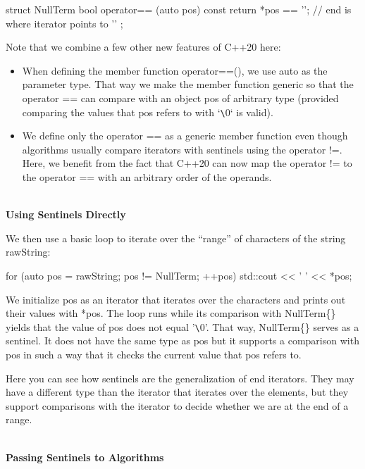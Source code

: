\begin{cpp}
struct NullTerm {
	bool operator== (auto pos) const {
		return *pos == '\0'; // end is where iterator points to ’\0’
	}
};
\end{cpp}

Note that we combine a few other new features of C++20 here:

\begin{itemize}
\item
When defining the member function operator==(), we use auto as the parameter type. That way we make the member function generic so that the operator == can compare with an object pos of arbitrary type (provided comparing the values that pos refers to with ‘\verb|\|0‘ is valid).

\item
We define only the operator == as a generic member function even though algorithms usually compare iterators with sentinels using the operator !=. Here, we benefit from the fact that C++20 can now map the operator != to the operator == with an arbitrary order of the operands.
\end{itemize}

\noindent
\hspace*{\fill} \\ %
\textbf{Using Sentinels Directly}

We then use a basic loop to iterate over the “range” of characters of the string rawString:

\begin{cpp}
for (auto pos = rawString; pos != NullTerm{}; ++pos) {
	std::cout << ' ' << *pos;
}
\end{cpp}

We initialize pos as an iterator that iterates over the characters and prints out their values with *pos. The loop runs while its comparison with NullTerm\{\} yields that the value of pos does not equal ’\verb|\|0’. That way, NullTerm\{\} serves as a sentinel. It does not have the same type as pos but it supports a comparison with pos in such a way that it checks the current value that pos refers to.

Here you can see how sentinels are the generalization of end iterators. They may have a different type than the iterator that iterates over the elements, but they support comparisons with the iterator to decide whether we are at the end of a range.

\noindent
\hspace*{\fill} \\ %
\textbf{Passing Sentinels to Algorithms}

